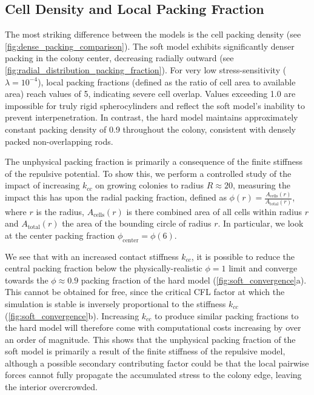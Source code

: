 \documentclass[a4paper,fleqn]{cas-dc}
\begin{document}
\subsection{Cell Density and Local Packing Fraction}

The most striking difference between the models is the cell packing density (see \autoref{fig:dense_packing_comparison}). The soft model exhibits significantly denser packing in the colony center, decreasing radially outward (see \autoref{fig:radial_distribution_packing_fraction}). For very low stress-sensitivity ($\lambda = 10^{-4}$), local packing fractions (defined as the ratio of cell area to available area) reach values of 5, indicating severe cell overlap. Values exceeding 1.0 are impossible for truly rigid spherocylinders and reflect the soft model's inability to prevent interpenetration. In contrast, the hard model maintains approximately constant packing density of 0.9 throughout the colony, consistent with densely packed non-overlapping rods.

The unphysical packing fraction is primarily a consequence of the finite stiffness of the repulsive potential. To show this, we perform a controlled study of the impact of increasing $k_{cc}$ on growing colonies to radius $R \approx 20$, measuring the impact this has upon the radial packing fraction, defined as $\phi(r) = \frac{A_{\text{cells}}(r)}{A_{\text{total}}(r)}$, where $r$ is the radius, $A_{\text{cells}}(r)$ is there combined area of all cells within radius $r$ and $A_{\text{total}}(r)$ the area of the bounding circle of radius $r$. In particular, we look at the center packing fraction $\phi_{\text{center}} = \phi(6)$.

We see that with an increased contact stiffness $k_{cc}$, it is possible to reduce the central packing fraction below the physically-realistic $\phi=1$ limit and converge towards the $\phi \approx 0.9$ packing fraction of the hard model (\autoref{fig:soft_convergence}a). This cannot be obtained for free, since the critical CFL factor at which the simulation is stable is inversely proportional to the stiffness $k_{cc}$ (\autoref{fig:soft_convergence}b). Increasing $k_{cc}$ to produce similar packing fractions to the hard model will therefore come with computational costs increasing by over an order of magnitude. This shows that the unphysical packing fraction of the soft model is primarily a result of the finite stiffness of the repulsive model, although a possible secondary contributing factor could be that the local pairwise forces cannot fully propagate the accumulated stress to the colony edge, leaving the interior overcrowded.
\end{document}
